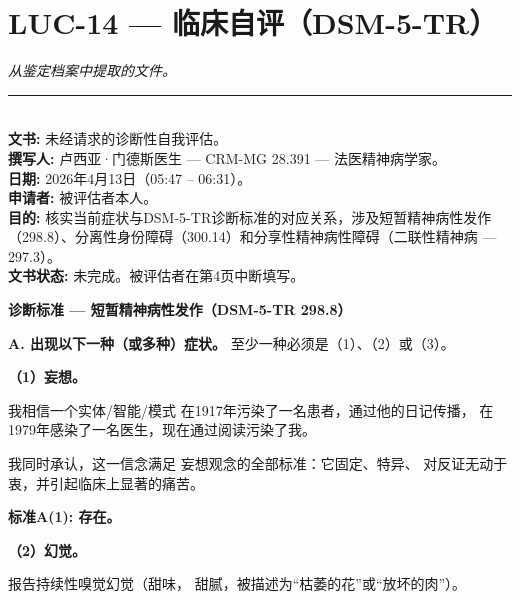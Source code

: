 \section*{\textbf{LUC-14} --- 临床自评（DSM-5-TR）}

\noindent \textit{从鉴定档案中提取的文件。}

\vspace{0.5em}\noindent\rule{\textwidth}{0.5pt}\vspace{0.5em}


\\[-0.2em]

\noindent\textbf{文书:} 未经请求的诊断性自我评估。\\
\noindent \textbf{撰写人:} 卢西亚·门德斯医生 --- CRM-MG 28.391 --- 法医精神病学家。\\
\noindent\textbf{日期:} 2026年4月13日（05:47 -- 06:31）。\\
\noindent \textbf{申请者:} 被评估者本人。\\
\noindent \textbf{目的:} 核实当前症状与DSM-5-TR诊断标准的对应关系，涉及短暂精神病性发作（298.8）、分离性身份障碍（300.14）和分享性精神病性障碍（二联性精神病 --- 297.3）。\\
\noindent \textbf{文书状态:} 未完成。被评估者在第4页中断填写。

\noindent \textbf{诊断标准 --- 短暂精神病性发作（DSM-5-TR 298.8）}

\noindent \textbf{A. 出现以下一种（或多种）症状。}
\noindent 至少一种必须是（1）、（2）或（3）。

\noindent \textbf{（1）妄想。}

\noindent 我相信一个实体\slash 智能\slash 模式
\noindent 在1917年污染了一名患者，通过他的日记传播，
\noindent 在1979年感染了一名医生，现在通过阅读污染了我。

\noindent 我同时承认，这一信念满足
\noindent 妄想观念的全部标准：它固定、特异、
\noindent 对反证无动于衷，并引起临床上显著的痛苦。

\noindent \textbf{标准A(1): 存在。}

\noindent \textbf{（2）幻觉。}

\noindent 报告持续性嗅觉幻觉（甜味，
\noindent 甜腻，被描述为\textquotedblleft{}枯萎的花\textquotedblright{}或\textquotedblleft{}放坏的肉\textquotedblright{}）。

